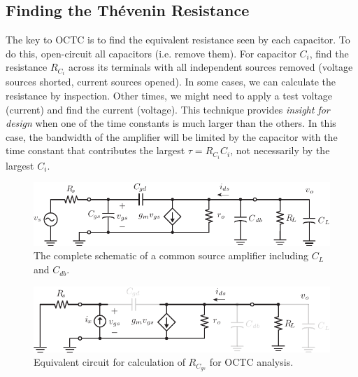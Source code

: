 \subsection{Finding the Thévenin Resistance}
The key to OCTC is to find the equivalent resistance seen by each capacitor.  To do this, open-circuit all capacitors (i.e. remove them).  For capacitor $C_i$, find the resistance $R_{C_i}$ across its terminals with all independent sources removed (voltage sources shorted, current sources opened).  In some cases, we can calculate the resistance by inspection. Other times, we might need to apply a test voltage (current) and find the current (voltage).  This technique provides \textit{insight for design} when one of the time constants is much larger than the others.  In this case, the bandwidth of the amplifier will be limited by the capacitor with the time constant that contributes the largest $\tau = R_{C_i} C_i$, not necessarily by the largest $C_i$.
\newpage
\begin{figure}[t]
\centering
\includegraphics[scale=1.05]{cs_amp_ac_caps}
\caption{The complete schematic of a common source amplifier including $C_L$ and $C_{db}$.}
\label{fig:cs_amp_ac_caps2}
\end{figure}
\begin{figure}[H]
\centering
\includegraphics[scale=1.15]{cs_amp_ac_caps_Cgs}
\caption{Equivalent circuit for calculation of $R_{C_{gs}}$ for OCTC analysis.}
\label{fig:cs_amp_ac_caps_Cgs}
\end{figure}
